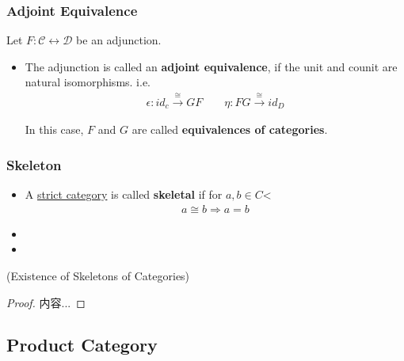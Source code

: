 \documentclass[Total.tex]{subfiles}
\begin{document}
				\subsubsection{Adjoint Equivalence}
					\begin{Def}
					Let $F:\mathcal{C}\leftrightarrow \mathcal{D}$ be an adjunction.
					
					\begin{itemize}
						\item  The adjunction is called an \textbf{adjoint equivalence}, if the unit and counit are natural isomorphisms. i.e.
						\begin{gather*}
							\epsilon:id_c\stackrel{\cong}{\rightarrow} GF\qquad \eta:FG\stackrel{\cong}{\rightarrow} id_D
						\end{gather*}
						
						In this case, $F$ and $G$ are called \textbf{equivalences of categories}.
					\end{itemize}
				\end{Def}
				
				\subsubsection{Skeleton}
					\begin{Def}
						\begin{itemize}
							\item 
							A \underline{strict category} is called \textbf{skeletal} if for $a,b\in C$<
							\begin{gather*}
								a\cong b\Rightarrow a=b
							\end{gather*}
							\item 
							\item 
						\end{itemize}
					\end{Def}
					
					\begin{theorem}
						(Existence of Skeletons of Categories)
					\end{theorem}
					\begin{proof}
						内容...
					\end{proof}
			\subsection{Product Category}
				
\end{document}
